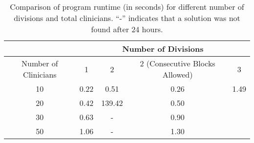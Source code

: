 \begin{table}
	\centering
	\begin{tabular}{|c|c|c|c|c|}
		\hline
		&       \multicolumn{4}{c|}{Number of Divisions}        \\ \hline
		Number of Clinicians &  1   &   2    & 2 (Consecutive Blocks Allowed) &  3   \\ \hline
		10          & 0.22 &  0.51  &              0.26              & 1.49 \\ \hline
		20          & 0.42 & 139.42 &              0.50              &     \\ \hline
		30          & 0.63 &   -    &              0.90              &     \\ \hline
		50          & 1.06 &   -    &              1.30              &     \\ \hline
	\end{tabular}
	\caption{Comparison of program runtime (in seconds) for different number of divisions and total clinicians. ``-'' indicates that a solution was not found after 24 hours.}
	\label{tbl:runtime-divisions-comparison}%
\end{table}